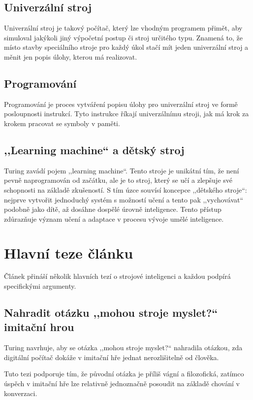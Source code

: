 \documentclass[a4paper,oneside,11pt,usenames,dvipsnames]{article}
\begin{document}
\subsection{Univerzální stroj}
\label{subsec:univerzalni-stroj}
Univerzální stroj je takový počítač, který lze vhodným programem přimět, aby simuloval jakýkoli jiný výpočetní postup či stroj určitého typu. Znamená to, že místo stavby speciálního stroje pro každý úkol stačí mít jeden univerzální stroj a měnit jen popis úlohy, kterou má realizovat.

\subsection{Programování}
\label{subsec:programovani}
Programování je proces vytváření popisu úlohy pro univerzální stroj ve formě posloupnosti instrukcí. Tyto instrukce říkají univerzálnímu stroji, jak má krok za krokem pracovat se symboly v paměti.

\subsection{,,Learning machine`` a dětský stroj}
\label{subsec:learning-machine}
Turing zavádí pojem ,,learning machine``. Tento stroje je unikátní tím, že není pevně naprogramován od začátku, ale je to stroj, který se učí a zlepšuje své schopnosti na základě zkušeností. S tím úzce souvísí koncepce ,,dětského stroje``: nejprve vytvořit jednoduchý systém s možností učení a tento pak ,,vychovávat`` podobně jako dítě, až dosáhne dospělé úrovně inteligence. Tento přístup zdůrazňuje význam učení a adaptace v procesu vývoje umělé inteligence.

\section{Hlavní teze článku}
\label{sec:hlavni-teze}
Článek přináší několik hlavních tezí o strojové inteligenci a každou podpírá specifickými argumenty.

\subsection{Nahradit otázku ,,mohou stroje myslet?{}`` imitační hrou}
\label{subsec:nahradit-otazku}
Turing navrhuje, aby se otázka ,,mohou stroje myslet?{}`` nahradila otázkou, zda digitální počítač dokáže v imitační hře jednat nerozlišitelně od člověka.

Tuto tezi podporuje tím, že původní otázka je příliš vágní a filozofická, zatímco úspěch v imitační hře lze relativně jednoznačně posoudit na základě chování v konverzaci.
\end{document}

